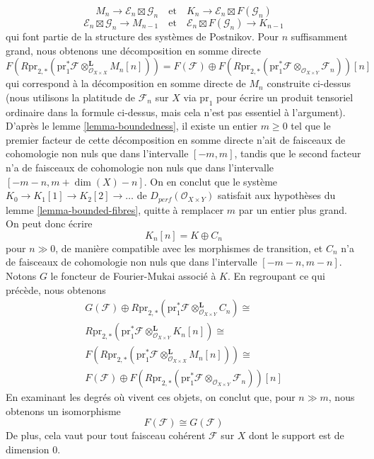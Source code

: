 $$
M_n \to \mathcal{E}_n \boxtimes \mathcal{G}_n
\quad\text{et}\quad
K_n \to \mathcal{E}_n \boxtimes F(\mathcal{G}_n)
$$
$$
\mathcal{E}_n \boxtimes \mathcal{G}_n \to M_{n - 1}
\quad\text{et}\quad
\mathcal{E}_n \boxtimes F(\mathcal{G}_n) \to K_{n - 1}
$$
qui font partie de la structure des systèmes de Postnikov.
Pour $n$ suffisamment grand, nous obtenons une décomposition en somme directe
$$
F(R\text{pr}_{2, *}(\text{pr}_1^*\mathcal{F}
\otimes^\mathbf{L}_{\mathcal{O}_{X \times X}} M_n[n]))
=
F(\mathcal{F}) \oplus
F(R\text{pr}_{2, *}(
\text{pr}_1^*\mathcal{F} \otimes_{\mathcal{O}_{X \times Y}} \mathcal{F}_n
))[n]
$$
qui correspond à la décomposition en somme directe de $M_n$ construite ci-dessus
(nous utilisons la platitude de $\mathcal{F}_n$ sur $X$ via $\text{pr}_1$
pour écrire un produit tensoriel ordinaire dans la formule ci-dessus, mais cela
n'est pas essentiel à l'argument).
D'après le lemme \ref{lemma-boundedness}, il existe un entier $m \geq 0$
tel que le premier facteur de cette décomposition en somme directe n'ait de
faisceaux de cohomologie non nuls que dans l'intervalle $[-m, m]$, tandis que le
second facteur n'a de faisceaux de cohomologie non nuls que dans l'intervalle
$[-m - n, m + \dim(X) - n]$.
On en conclut que le système $K_0 \to K_1[1] \to K_2[2] \to \ldots$
de $D_{perf}(\mathcal{O}_{X \times Y})$ satisfait aux hypothèses du
lemme \ref{lemma-bounded-fibres}, quitte à remplacer $m$ par un entier plus grand. On peut donc écrire
$$
K_n[n] = K \oplus C_n
$$
pour $n \gg 0$, de manière compatible avec les morphismes de transition, et
$C_n$ n'a de faisceaux de cohomologie non nuls que dans l'intervalle $[-m - n, m - n]$.
Notons $G$ le foncteur de Fourier-Mukai associé à $K$.
En regroupant ce qui précède, nous obtenons
$$
\begin{matrix}
G(\mathcal{F}) \oplus
R\text{pr}_{2, *}(
\text{pr}_1^*\mathcal{F} \otimes_{\mathcal{O}_{X \times Y}}^\mathbf{L} C_n)
\cong \\
R\text{pr}_{2, *}(\text{pr}_1^*\mathcal{F}
\otimes^\mathbf{L}_{\mathcal{O}_{X \times Y}} K_n[n]) \cong \\
F(R\text{pr}_{2, *}(\text{pr}_1^*\mathcal{F}
\otimes^\mathbf{L}_{\mathcal{O}_{X \times X}} M_n[n]))
\cong \\
F(\mathcal{F}) \oplus
F(R\text{pr}_{2, *}(
\text{pr}_1^*\mathcal{F} \otimes_{\mathcal{O}_{X \times Y}} \mathcal{F}_n
))[n]
\end{matrix}
$$
En examinant les degrés où vivent ces objets, on conclut que, pour $n \gg m$,
nous obtenons un isomorphisme
$$
F(\mathcal{F}) \cong G(\mathcal{F})
$$
De plus, cela vaut pour tout faisceau cohérent $\mathcal{F}$ sur $X$
dont le support est de dimension $0$.

